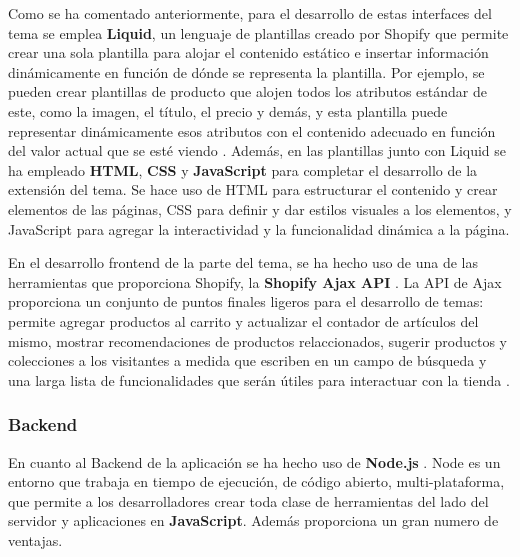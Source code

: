 \documentclass[12pt]{article}
\begin{document}
Como se ha comentado anteriormente, para el desarrollo de estas interfaces del tema se emplea \textbf{Liquid}, un lenguaje de plantillas creado por Shopify que
permite crear una sola plantilla para alojar el contenido estático e insertar información dinámicamente en función de dónde se representa la plantilla.
Por ejemplo, se pueden crear plantillas de producto que alojen todos los atributos estándar de este, como la imagen, el título, el precio y demás, y esta 
plantilla puede representar dinámicamente esos atributos con el contenido adecuado en función del valor actual que se esté viendo \cite{shopify-dev}. 
Además, en las plantillas junto con Liquid se ha empleado \textbf{HTML}, \textbf{CSS} y \textbf{JavaScript} para completar el desarrollo de la extensión del tema. Se hace uso de HTML para estructurar
el contenido y crear elementos de las páginas, CSS para definir y dar estilos visuales a los elementos, y JavaScript para agregar la interactividad y la 
funcionalidad dinámica a la página. 

En el desarrollo frontend de la parte del tema, se ha hecho uso de una de las herramientas que proporciona Shopify, la \textbf{Shopify Ajax API} \cite{shopify-ajax-api}. La API de Ajax
proporciona un conjunto de puntos finales ligeros para el desarrollo de temas: permite agregar productos al carrito y actualizar el contador
de artículos del mismo, mostrar recomendaciones de productos relaccionados, sugerir productos y colecciones a los visitantes a medida que escriben
en un campo de búsqueda y una larga lista de funcionalidades que serán útiles para interactuar con la tienda \cite{shopify-dev}.

\subsubsection{Backend}
En cuanto al Backend de la aplicación se ha hecho uso de \textbf{Node.js} \cite{node}. Node es un entorno que trabaja en tiempo de ejecución, de código abierto, multi-plataforma, 
que permite a los desarrolladores crear toda clase de herramientas del lado del servidor y aplicaciones en \textbf{JavaScript}. 
Además proporciona un gran numero de ventajas. 
\end{document}
